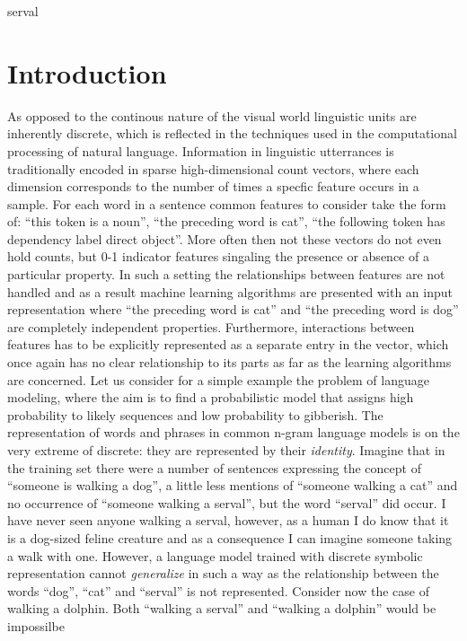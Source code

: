 
serval
\chapter{Introduction}
\label{introduction}
As opposed to the continous nature of the visual world linguistic units are inherently
discrete, which is reflected in the techniques used in the computational processing
of natural language. Information in linguistic utterrances is traditionally encoded
in sparse high-dimensional count vectors, where each
dimension corresponds to the number of times a specfic feature occurs in a sample.
For each word in a sentence common features to consider take the form of:
``this token is a noun'', ``the preceding word is cat'',
``the following token has dependency label direct object''.
More often then not these vectors do not even hold counts, but 0-1 indicator features singaling
the presence or absence of a particular property.
In such a setting the relationships between features are not handled and
as a result machine learning algorithms are presented with an input representation where
``the preceding word is cat'' and ``the preceding word is dog''
are completely independent properties. Furthermore, interactions between features has to be
explicitly represented as a separate entry in the vector, which once again has no clear
relationship to its parts as far as the learning algorithms are concerned. Let us consider
for a simple example the problem of language modeling, where the aim is to find a probabilistic model
that assigns high probability to likely sequences and low probability to gibberish.
The representation of words and phrases in common n-gram language models is on the
very extreme of discrete: they are represented by their \emph{identity}.
Imagine that in the training set there were a number of sentences expressing the concept
of ``someone is walking a dog'', a little less mentions of ``someone walking a cat''
and no occurrence of ``someone walking a serval'', but the word ``serval'' did occur.
I have never seen anyone walking a serval, however, as a human I do know that it is a dog-sized
feline creature and as a consequence I can imagine someone taking a walk with one. However, a language
model trained with discrete symbolic representation cannot \emph{generalize} in such a way as the
relationship between the words ``dog'', ``cat'' and ``serval'' is not represented. Consider now the
case of walking a dolphin. Both ``walking a serval'' and ``walking a dolphin'' would be impossilbe
